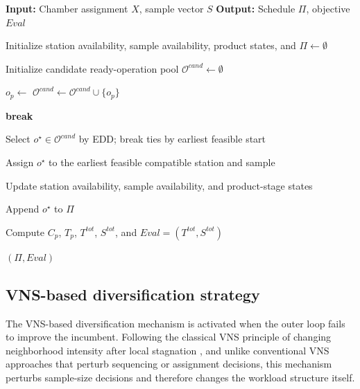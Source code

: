 \documentclass[11pt]{article}
\begin{document}
\begin{algorithm}[H]
\caption{Scheduling Procedure (EDD-Based Feasible Construction)}
\label{alg:scheduling_procedure}
\begin{algorithmic}[1]

\State \textbf{Input:} Chamber assignment $X$, sample vector $S$
\State \textbf{Output:} Schedule $\Pi$, objective $Eval$

\State Initialize station availability, sample availability, product states, and $\Pi \gets \emptyset$


    \State Initialize candidate ready-operation pool $\mathcal{O}^{cand}\gets\emptyset$

        \State $o_p \gets$ 
            \State $\mathcal{O}^{cand} \gets \mathcal{O}^{cand} \cup \{o_p\}$
        \EndIf
    \EndFor

        \State \textbf{break}
    \EndIf

    \State Select $o^\star \in \mathcal{O}^{cand}$ by EDD; break ties by earliest feasible start

    \State Assign $o^\star$ to the earliest feasible compatible station and sample

    \State Update station availability, sample availability, and product-stage states

    \State Append $o^\star$ to $\Pi$

\EndWhile

\State Compute $C_p$, $T_p$, $T^{tot}$, $S^{tot}$, and $Eval=(T^{tot},S^{tot})$

\State {}

\State \Return $(\Pi, Eval)$

\end{algorithmic}
\end{algorithm}

\subsection{VNS-based diversification strategy}
\label{subsec:vns}

The VNS-based diversification mechanism is activated when the outer loop
fails to improve the incumbent. Following the classical VNS principle of
changing neighborhood intensity after local stagnation \citep{LiaoCheng2007},
and unlike conventional VNS approaches that perturb sequencing or assignment
decisions, this mechanism perturbs sample-size decisions and therefore changes the workload structure itself.
\end{document}
